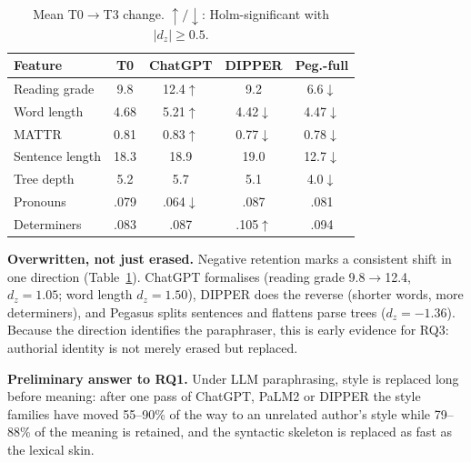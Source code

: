 \begin{table}[t]
\small
\centering
\caption{Mean T0$\to$T3 change. $\uparrow/\downarrow$: Holm-significant with $|d_z|\ge0.5$.}
\label{tab:shifts}
\begin{tabular}{lcccc}
\toprule
\textbf{Feature} & \textbf{T0} & \textbf{ChatGPT} & \textbf{DIPPER} & \textbf{Peg.-full} \\
\midrule
Reading grade   & 9.8   & 12.4$\uparrow$  & 9.2            & 6.6$\downarrow$ \\
Word length     & 4.68  & 5.21$\uparrow$  & 4.42$\downarrow$ & 4.47$\downarrow$ \\
MATTR           & 0.81  & 0.83$\uparrow$  & 0.77$\downarrow$ & 0.78$\downarrow$ \\
Sentence length & 18.3  & 18.9            & 19.0           & 12.7$\downarrow$ \\
Tree depth      & 5.2   & 5.7             & 5.1            & 4.0$\downarrow$ \\
Pronouns        & .079  & .064$\downarrow$ & .087          & .081 \\
Determiners     & .083  & .087            & .105$\uparrow$ & .094 \\
\bottomrule
\end{tabular}
\end{table}

\textbf{Overwritten, not just erased.} Negative retention marks a consistent shift in one
direction (Table~\ref{tab:shifts}). ChatGPT formalises (reading grade 9.8$\to$12.4, $d_z=1.05$;
word length $d_z=1.50$), DIPPER does the reverse (shorter words, more determiners), and Pegasus
splits sentences and flattens parse trees ($d_z=-1.36$). Because the direction identifies the
paraphraser, this is early evidence for RQ3: authorial identity is not merely erased but replaced.

\textbf{Preliminary answer to RQ1.} Under LLM paraphrasing, style is replaced long before meaning:
after one pass of ChatGPT, PaLM2 or DIPPER the style families have moved 55--90\% of the way to
an unrelated author's style while 79--88\% of the meaning is retained, and the syntactic skeleton
is replaced as fast as the lexical skin.
